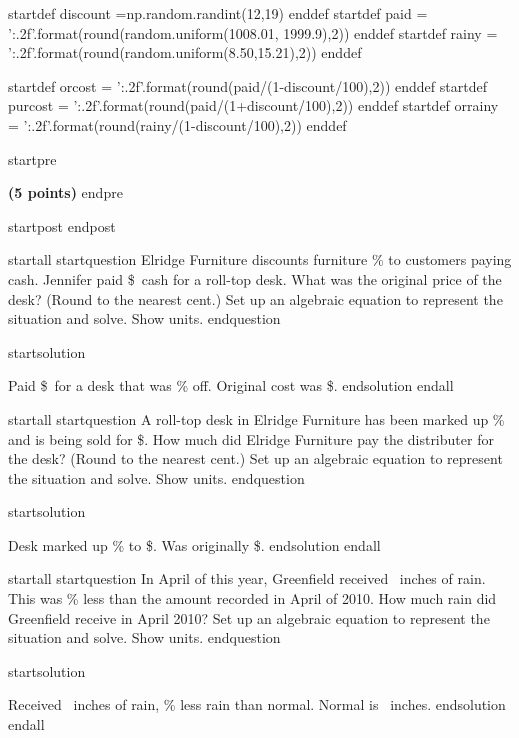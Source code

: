 startdef discount =np.random.randint(12,19) enddef 
startdef paid = '{:.2f}'.format(round(random.uniform(1008.01, 1999.9),2)) enddef
startdef rainy = '{:.2f}'.format(round(random.uniform(8.50,15.21),2)) enddef

startdef orcost = '{:.2f}'.format(round(paid/(1-discount/100),2)) enddef
startdef purcost = '{:.2f}'.format(round(paid/(1+discount/100),2)) enddef
startdef orrainy = '{:.2f}'.format(round(rainy/(1-discount/100),2)) enddef


startpre
\item {\bf (5 points)} 
endpre

startpost
\vfill 
endpost


startall
startquestion Elridge Furniture discounts furniture \discount\% to customers paying cash. Jennifer paid \$\paid\ cash for a roll-top desk. What was the original price of the desk? (Round to the nearest cent.) Set up an algebraic equation to represent the situation and solve. Show units.
endquestion 

startsolution
\item Paid \$\paid\ for a desk that was \discount\% off. Original cost was \$\orcost. 
endsolution
endall


startall
startquestion A roll-top desk in Elridge Furniture has been marked up \discount\% and is being sold for \$\paid. How much did Elridge Furniture pay the distributer for the desk? (Round to the nearest cent.) Set up an algebraic equation to represent the situation and solve. Show units.
endquestion 

startsolution
\item Desk marked up \discount\% to \$\paid. Was originally \$\purcost. 
endsolution
endall


startall
startquestion In April of this year, Greenfield received \rainy\ inches of rain. This was \discount\% less than the amount recorded in April of 2010. How much rain did Greenfield  receive in April 2010? Set up an algebraic equation to represent the situation and solve. Show units.
endquestion 

startsolution
\item Received \rainy\ inches of rain, \discount\% less rain than normal. Normal is \orrainy\ inches.
endsolution
endall
